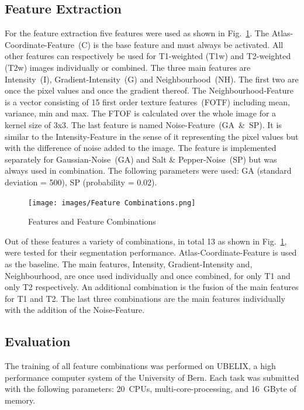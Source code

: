 \documentclass[conference]{IEEEtran}
\begin{document}
\subsection{Feature Extraction} \label{subsec:Feature Extraction}
For the feature extraction five features were used as shown in  Fig.~\ref{fig:Features and Feature Combinations}. The Atlas-Coordinate-Feature~(C) is the base feature and must always be  activated. All other features can respectively be used for T1-weighted (T1w) and T2-weighted (T2w) images individually or combined. The three main features are Intensity~(I), Gradient-Intensity~(G) and Neighbourhood~(NH). The first two are once the pixel values and once the gradient thereof. The Neighbourhood-Feature is a vector consisting of 15 first order texture features~(FOTF) including mean, variance, min and max. The FTOF is calculated over the whole image for a kernel size of 3x3. The last feature is named Noise-Feature~(GA~\&~SP). It is similar to the Intensity-Feature in the sense of it representing the pixel values but with the difference of noise added to the image. The feature is implemented separately for Gaussian-Noise~(GA) and Salt \& Pepper-Noise~(SP) but was always used in combination. The following parameters were used: GA (standard deviation = 500), SP (probability = 0.02).

\begin{figure}[h!]
  \centering
  \texttt{[image: images/Feature Combinations.png]}
  \caption{Features and Feature Combinations}
  \label{fig:Features and Feature Combinations}
\end{figure}

Out of these features a variety of combinations, in total 13 as shown in Fig.~\ref{fig:Features and Feature Combinations}, were tested for their segmentation performance. Atlas-Coordinate-Feature is used as the baseline. The main features, Intensity, Gradient-Intensity and, Neighbourhood, are once used individually and once combined, for only T1 and only T2 respectively. An additional combination is the fusion of the main features for T1 and T2. The last three combinations are the main features individually with the addition of the Noise-Feature.

\subsection{Evaluation} \label{subsec:Evaluation}
The training of all feature combinations was performed on UBELIX, a high performance computer system of the University of Bern. Each task was submitted with the following parameters: 20~CPUs, multi-core-processing, and 16~GByte of memory.
\end{document}

